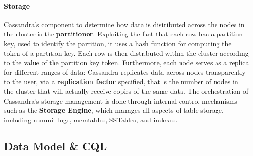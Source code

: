 \paragraph{Storage} Cassandra's component to determine how data is distributed across the nodes in the cluster is the \textbf{partitioner}. Exploiting the fact that each row has a partition key, used to identify the partition, it uses a hash function for computing the token of a partition key. Each row is then distributed within the cluster according to the value of the partition key token. Furthermore, each node serves as a replica for different ranges of data: Cassandra replicates data across nodes transparently to the user, via a \textbf{replication factor} specified, that is the number of nodes in the cluster that will actually receive copies of the same data.
The orchestration of Cassandra's storage management is done through internal control mechanisms such as the \textbf{Storage Engine}, which manages all aspects of table storage, including commit logs, memtables, SSTables, and indexes.

\subsection{Data Model \& CQL}

